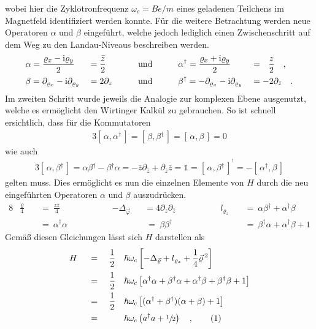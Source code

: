 \documentclass[a4paper,11pt, twoside]{article}
\newcommand{\ind}[2]{{_{#1}^{#2}}}
\newcommand{\+}{\dagger}
\newcommand{\com}[2]{[\, #1, #2 \,]}
\newcommand\numberthis{\stepcounter{equation}  \tag{\theequation}} %
\renewcommand{\'}{\tt\textquotesingle}
\renewcommand{\v}{\vec}
\renewcommand{\^}{\hat}
\renewcommand{\tt}{\text}
\renewcommand{\~}{\widetilde}
\begin{document}
wobei hier die Zyklotronfrequenz $\omega_c= Be/m$ eines geladenen Teilchens im Magnetfeld identifiziert werden konnte. Für die weitere Betrachtung werden neue Operatoren $\alpha$ und $\beta$ eingeführt, welche jedoch lediglich einen Zwischenschritt auf dem Weg zu den Landau-Niveaus beschreiben werden.
\begin{alignat*}{5}
& \alpha = \frac{\varrho_x-\tt i \varrho_y}{2}&&=\frac{\bar z}{2} && \qquad \tt{und} \qquad && \alpha\ind{}{\+} = \frac{\varrho_x+\tt i \varrho_y}{2}&&=\ \ \frac{ z}{2} \quad, \\
& \beta = \partial_{\varrho_x}-\tt i \partial_{\varrho_y}&&=2\partial_z && \qquad \tt{und} \qquad && \beta\ind{}{\+} = -\partial_{\varrho_x}-\tt i \partial_{\varrho_y}&&=-2\partial_{\bar z} \quad.
\end{alignat*}
Im zweiten Schritt wurde jeweils die Analogie zur komplexen Ebene ausgenutzt, welche es ermöglicht den Wirtinger Kalkül zu gebrauchen. So ist schnell ersichtlich, dass für die Kommutatoren 
\begin{alignat*}{3}
 \com{\alpha}{\alpha\ind{}{\+}} = \com{\beta}{\beta\ind{}{\+}} = \com{\alpha}{\beta} = 0
\end{alignat*}
wie auch 
\begin{alignat*}{3}
\com{\alpha}{\beta\ind{}{\+}} = \alpha\beta\ind{}{\+} - \beta\ind{}{\+}\alpha= -\bar z\partial_{\bar z} + \partial_{\bar z} \bar z  =  \mathds{1} 
= \com{\alpha}{\beta\ind{}{\+}}^{^{\scriptstyle \+}} = - \com{\alpha\ind{}{\+}}{\beta}
\end{alignat*}
gelten muss. Dies ermöglicht es nun die einzelnen Elemente von $H$ durch die neu eingeführten Operatoren $\alpha$ und $\beta$ auszudrücken. 
\begin{alignat*}{8}
& \frac{\varrho}{4}&&\ =\  \frac{z\bar z }{4}  &&\qquad && -\Delta_{\v \varphi}&&= 4\partial_z\partial_{\bar z}
&& \qquad && l_{\varrho_z}  &&\ =\  \alpha\beta\ind{}{\+} + \alpha\ind{}{\+}\beta  \\
& &&\ =\  \alpha\ind{}{\+}\alpha && && &&\ =\ \beta\beta\ind{}{\+}  && && && \ =\ \beta\ind{}{\+}\alpha + \alpha\ind{}{\+}\beta +1 
\end{alignat*}
Gemäß diesen Gleichungen lässt sich $H$ darstellen als 
\begin{alignat*}{4}
& H &&\ = \ && \frac{1}{2}&&\hbar\omega _c \left [-\Delta_{\v \varrho} + l_{\varrho_z} +\frac{1}{4}\v \varrho\, ^2\right ] \\
& &&\ = \ &&\frac{1}{2}&&\hbar\omega_c \left [\alpha\ind{}{\+}\alpha + \beta\ind{}{\+}\alpha + \alpha\ind{}{\+}\beta +\beta\ind{}{\+}\beta+1\right ] \\
& &&\ = \ && \frac{1}{2}&&\hbar\omega_c \left [(\alpha\ind{}{\+}+\beta\ind{}{\+})(\alpha+\beta)+1\right ] \\
& &&\ = \ && &&\hbar\omega_c \left (a\ind{}{\+}a+\sfrac{1}{2}\right )\quad , \numberthis \label{Landau Hamiltonian Elektron}
\end{alignat*}
\end{document}
